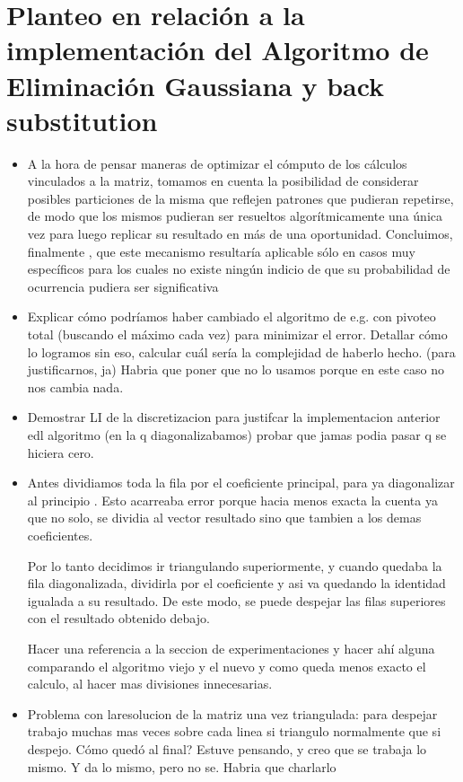 \documentclass[double,12pt]{beavtex}
\begin{document}
{\section{Planteo en relaci\'on a la implementaci\'on del Algoritmo de Eliminaci\'on Gaussiana y back substitution}
{ \color{red}
\begin{itemize}
\item{A la hora de pensar maneras de optimizar el c\'omputo de los c\'alculos vinculados a la matriz, tomamos en cuenta la posibilidad de considerar posibles particiones de la misma que reflejen patrones que pudieran repetirse, de modo que los mismos pudieran ser resueltos algor\'itmicamente una \'unica vez para luego replicar su resultado en m\'as de una oportunidad. Concluimos, finalmente , que este mecanismo resultar\'ia aplicable s\'olo en casos muy espec\'ificos para los cuales no existe ning\'un indicio de que su probabilidad de ocurrencia pudiera ser significativa}

\item Explicar c\'omo podr\'iamos haber cambiado el algoritmo de e.g. con pivoteo total (buscando el m\'aximo cada vez) para minimizar el error. Detallar c\'omo lo logramos sin eso, calcular cu\'al ser\'ia la complejidad de haberlo hecho. (para justificarnos, ja) Habria que poner que no lo usamos porque en este caso no nos cambia nada.

\item Demostrar LI de la discretizacion para justifcar la implementacion anterior edl algoritmo (en la q diagonalizabamos) probar que jamas podia pasar q se hiciera cero.

\item Antes dividiamos toda la fila por el coeficiente principal, para ya diagonalizar al principio . Esto acarreaba error porque hacia menos exacta la cuenta ya que no solo, se dividia al vector resultado sino que tambien a los demas coeficientes. 

Por lo tanto decidimos ir triangulando superiormente, y cuando quedaba la fila diagonalizada, dividirla por el coeficiente y asi va quedando la identidad igualada a su resultado. De este modo, se puede despejar las filas superiores con el resultado obtenido debajo.

Hacer una referencia a la seccion de experimentaciones y hacer ah\'i alguna comparando el algoritmo viejo y el nuevo y como queda menos exacto el calculo, al hacer mas divisiones innecesarias.

\item 
Problema con laresolucion de la matriz una vez triangulada: para despejar trabajo muchas mas veces sobre cada linea si triangulo normalmente que si despejo. C\'omo qued\'o al final? Estuve pensando, y creo que se trabaja lo mismo. Y da lo mismo, pero no se. Habria que charlarlo


\end{itemize}}}
\end{document}
